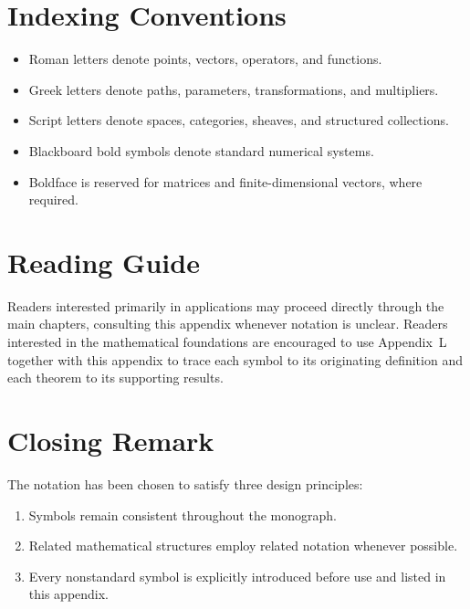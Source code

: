 \documentclass[11pt]{book}
\numberwithin{equation}{chapter}
\theoremstyle{definition}
\theoremstyle{plain}
\begin{document}

\section{Indexing Conventions}

\begin{itemize}

\item Roman letters denote points, vectors, operators, and functions.

\item Greek letters denote paths, parameters, transformations, and
multipliers.

\item Script letters denote spaces, categories, sheaves, and structured
collections.

\item Blackboard bold symbols denote standard numerical systems.

\item Boldface is reserved for matrices and finite-dimensional vectors,
where required.

\end{itemize}


\section{Reading Guide}

Readers interested primarily in applications may proceed directly through
the main chapters, consulting this appendix whenever notation is
unclear. Readers interested in the mathematical foundations are
encouraged to use Appendix~L together with this appendix to trace each
symbol to its originating definition and each theorem to its supporting
results.


\section{Closing Remark}

The notation has been chosen to satisfy three design principles:

\begin{enumerate}

\item Symbols remain consistent throughout the monograph.

\item Related mathematical structures employ related notation whenever
possible.

\item Every nonstandard symbol is explicitly introduced before use and
listed in this appendix.

\end{enumerate}
\end{document}
